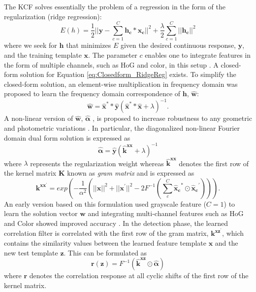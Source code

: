 \documentclass[10pt,twocolumn,letterpaper]{article}
\begin{document}
The KCF solves essentially the problem of a regression in the form of
the regularization (ridge regression):
\begin{equation}
E(h) = \frac{1}{2}||\mathbf{y}-\sum_{c=1}^{C}\mathbf{h_{c}}*\mathbf{x_{c}}||^{2} + \frac{\lambda}{2}\sum_{c=1}^{C}||\mathbf{h_{c}}||^{2}
\label{eq:Closedform_RidgeReg}
\end{equation}
where we seek for $\mathbf{h}$ that minimizes $E$ given the desired
continuous response, $\mathbf{y}$, and the training template
$\mathbf{x}$.  The parameter $c$ enables one to integrate features in
the form of multiple channels, such as HoG and color, in this setup
\cite{henriques2015high,galoogahi2013multi}.  A closed-form solution
for Equation \ref{eq:Closedform_RidgeReg} exists. To simplify the
closed-form solution, an element-wise multiplication in frequency
domain was proposed to learn the frequency domain correspondence of
$\mathbf{h}$, $\mathbf{\hat{w}}$:
\begin{equation}
\mathbf{\hat{w}} = \mathbf{\hat{x}^{*}}*\mathbf{\hat{y}}(\mathbf{\hat{x}^{*}}*\mathbf{\hat{x}}+\lambda)^{-1}.
\label{eq:DiagonalizedPrimalSolution}
\end{equation}
A non-linear version of $\mathbf{\hat{w}}$, $\mathbf{\hat{\alpha}}$ , is proposed to increase robustness
to any geometric and photometric variations
\cite{henriques2015high}. In particular, the diagonalized non-linear Fourier
domain dual form solution is expressed as
\begin{equation}
\mathbf{\hat{\alpha}} = \mathbf{\hat{y}}(\mathbf{\hat{k}^{xx}}+\lambda)^{-1}
\label{eq:FourierDualDomainSolution}
\end{equation}
where $\lambda$ represents the regularization weight whereas $\mathbf{\hat{k}^{xx}}$ denotes
 the first row of the kernel matrix $\mathbf{K}$ known as \textit{gram matrix} and is expressed as
\begin{equation}
\mathbf{k^{xx^{'}}} = exp(-\dfrac{1}{\alpha^{2}}(||\mathbf{x}||^{2}+||\mathbf{x}^{'}||^{2}-2F^{-1}(\sum^{C}_{c}\mathbf{\hat{x}_{c}}^{*}\odot \mathbf{\hat{x}_{c}}^{'}))).
\label{eq:GaussianCorrelationSingleChannel}
\end{equation}
An early version based on this formulation used grayscale feature
($C=1$) to learn the solution vector $\mathbf{w}$ and integrating
multi-channel features such as HoG and Color showed improved accuracy
\cite{henriques2015high,galoogahi2013multi,tang2015multi,ma2015long,bibi2015multi}.
In the detection phase, the learned correlation filter is correlated
with the first row of the gram matrix, $\mathbf{k^{xz^{'}}}$, which
contains the similarity values between the learned feature template
$\mathbf{x}$ and the new test template $\mathbf{z}$. This can be
formulated as
\begin{equation}
\mathbf{r(z)} = F^{-1}(\mathbf{\hat{k}^{xz}} \odot \mathbf{\hat{\alpha}})
\end{equation}
where $\mathbf{r}$ denotes the correlation response at all cyclic shifts of the
first row of the kernel matrix.
\end{document}
